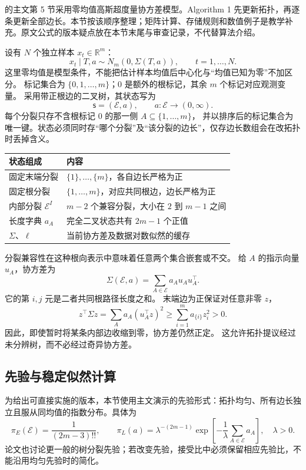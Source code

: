 \citet{S16} 的主文第 5 节采用零均值高斯超度量协方差模型。Algorithm 1 先更新拓扑，再逐条更新全部边长。本节按该顺序整理；矩阵计算、存储规则和数值例子是教学补充。原文公式的版本疑点放在本节末尾与审查记录，不代替算法介绍。

设有 $N$ 个独立样本 $x_t\in\mathbb R^m$：
\[
 x_t\mid T,a\sim N_m(0,\Sigma(T,a)),\qquad t=1,\ldots,N.
\]
这里零均值是模型条件，不能把估计样本均值后中心化与“均值已知为零”不加区分。
标记集合为 $\{0,1,\ldots,m\}$；$0$ 是额外的根标记，其余 $m$ 个标记对应观测变量。
采用带正根边的二叉树，其状态写为
\[
 \mathsf s=(\mathcal E,a),\qquad
 a:\mathcal E\longrightarrow(0,\infty).
\]
每个分裂只存不含根标记 $0$ 的那一侧 $A\subseteq\{1,\ldots,m\}$，
并以排序后的标记集合为唯一键。状态必须同时存“哪个分裂”及“该分裂的边长”，仅存边长数组会在改拓扑时丢掉含义。

\begin{center}
\begin{tabularx}{\linewidth}{lX}
\toprule
状态组成 & 内容\\
\midrule
固定末端分裂 & $\{1\},\ldots,\{m\}$，各自边长严格为正\\
固定根分裂 & $\{1,\ldots,m\}$，对应共同根边，边长严格为正\\
内部分裂 $\mathcal E^I$ & $m-2$ 个兼容分裂，大小在 $2$ 到 $m-1$ 之间\\
长度字典 $a_A$ & 完全二叉状态共有 $2m-1$ 个正值\\
$\Sigma$、$\ell$ & 当前协方差及数据对数似然的缓存\\
\bottomrule
\end{tabularx}
\end{center}

分裂兼容性在这种根向表示中意味着任意两个集合嵌套或不交。
给 $A$ 的指示向量 $u_A$，协方差为
\begin{equation}
 \Sigma(\mathcal E,a)=\sum_{A\in\mathcal E}a_Au_Au_A^\top.
 \label{eq:textbook-S16-sigma}
\end{equation}
它的第 $i,j$ 元是二者共同根路径长度之和。
末端边为正保证对任意非零 $z$，
\[
 z^\top\Sigma z
 =\sum_Aa_A(u_A^\top z)^2
 \ge\sum_{i=1}^m a_{\{i\}}z_i^2>0.
\]
因此，即使暂时将某条内部边收缩到零，协方差仍然正定。
这允许拓扑提议经过未分辨树，而不必经过奇异协方差。

\subsection{先验与稳定似然计算}

为给出可直接实施的版本，本节使用主文演示的先验形式：拓扑均匀、所有边长独立且服从同均值的指数分布。具体为
\[
 \pi_E(\mathcal E)=\frac1{(2m-3)!!},\qquad
 \pi_L(a)=\lambda^{-(2m-1)}
 \exp\!\left[-\frac1\lambda\sum_{A\in\mathcal E}a_A\right],
 \quad \lambda>0.
\]
论文也讨论更一般的树分裂先验；若改变先验，接受比中必须保留相应先验比，不能沿用均匀先验时的简化。

